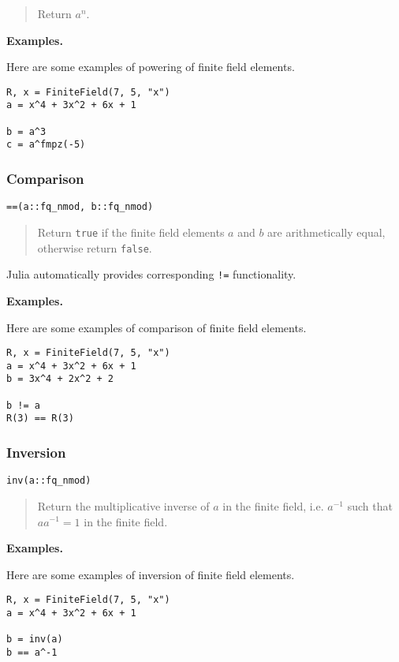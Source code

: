 \documentclass[a4paper,10pt]{article}
\newcommand{\code}{\lstinline}
\newcommand{\desc}[1]{\vspace{-3mm}\begin{quote}#1\end{quote}}
\begin{document}
{{\desc{Return $a^n$.}

\textbf{Examples.}

Here are some examples of powering of finite field elements.

\begin{lstlisting}
R, x = FiniteField(7, 5, "x")
a = x^4 + 3x^2 + 6x + 1

b = a^3
c = a^fmpz(-5)
\end{lstlisting}

\subsubsection{Comparison}

\begin{lstlisting}
==(a::fq_nmod, b::fq_nmod)
\end{lstlisting}

\desc{Return \code{true} if the finite field elements $a$ and $b$ are 
arithmetically equal, otherwise return \code{false}.}

Julia automatically provides corresponding \code{!=} functionality.

\textbf{Examples.}

Here are some examples of comparison of finite field elements.

\begin{lstlisting}
R, x = FiniteField(7, 5, "x")
a = x^4 + 3x^2 + 6x + 1
b = 3x^4 + 2x^2 + 2

b != a
R(3) == R(3)
\end{lstlisting}

\subsubsection{Inversion}

\begin{lstlisting}
inv(a::fq_nmod)
\end{lstlisting}

\desc{Return the multiplicative inverse of $a$ in the finite field, i.e. 
$a^{-1}$ such that $aa^{-1} = 1$ in the finite field.}

\textbf{Examples.}

Here are some examples of inversion of finite field elements.

\begin{lstlisting}
R, x = FiniteField(7, 5, "x")
a = x^4 + 3x^2 + 6x + 1

b = inv(a)
b == a^-1
\end{lstlisting}

}}
\end{document}
